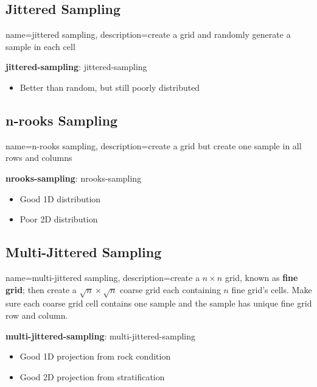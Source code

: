   \subsection{Jittered Sampling}

    {
      name=jittered sampling,
      description={create a grid and randomly generate a sample in each cell}
    }

    \textbf{\Gls{jittered-sampling}}: \glsdesc{jittered-sampling}

    \begin{itemize}
      \item Better than random, but still poorly distributed
    \end{itemize}

  \subsection{n-rooks Sampling}

    {
      name=n-rooks sampling,
      description={create a grid but create one sample in all rows and columns}
    }

    \textbf{\Gls{nrooks-sampling}}: \glsdesc{nrooks-sampling}

    \begin{itemize}
      \item Good 1D distribution
      \item Poor 2D distribution
    \end{itemize}

  \subsection{Multi-Jittered Sampling}

    {
      name=multi-jittered sampling,
      description={create a $ n \times n $ grid, known as \textbf{fine grid};
      then create a $ \sqrt{n} \times \sqrt{n} $ coarse grid each
      containing $ n $ fine grid's cells.
      Make sure each coarse grid cell contains one sample
      and the sample has unique fine grid row and column.}
    }

    \textbf{\Gls{multi-jittered-sampling}}: \glsdesc{multi-jittered-sampling}

    \begin{itemize}
      \item Good 1D projection from rock condition
      \item Good 2D projection from stratification
    \end{itemize}
